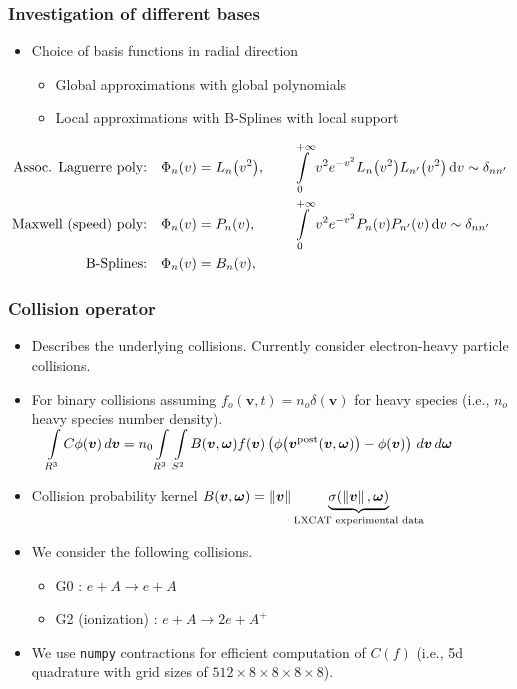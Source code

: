 \documentclass[mathserif, aspectratio=169]{beamer}
\newcommand{\ud}{\,\mathrm{d}}
\newcommand{\vect}[1]{\boldsymbol{#1}}
\newcommand{\of}[1]{\mleft( #1 \mright)}
\newcommand{\myint}{\int\limits}
\newcommand{\diff}[1]{\, d#1}
\newcommand{\norm}[1]{\left\lVert#1\right\rVert}
\begin{document}
\begin{frame}
	\frametitle{Investigation of different bases}
	\begin{itemize}
		\item Choice of basis functions in radial direction
		\begin{itemize}
			\item Global approximations with global polynomials
			\item Local approximations with B-Splines with local support 
		\end{itemize}
	\end{itemize}
		\small
		\begin{align*}
		\textrm{Assoc. Laguerre poly:}
		& \quad \Phi_n\of{v} = L_n\of{v^2}, &&
		\quad 
		\myint_{0}^{+\infty} v^2 e^{-v^2} L_n\of{v^2} L_{n^\prime}\of{v^2} \ud v \sim \delta_{nn^\prime}
		\\
		\textrm{Maxwell (speed) poly:}
		& \quad \Phi_n\of{v} = P_n\of{v}, &&
		\quad 
		\myint_{0}^{+\infty} v^2 e^{-v^2} P_n\of{v} P_{n^\prime}\of{v} \ud v \sim \delta_{nn^\prime}
		\\
		\textrm{B-Splines:}
		& \quad \Phi_n\of{v} = B_n\of{v}, &&
		\end{align*}	
\end{frame}

\begin{frame}[fragile]
	\frametitle{Collision operator}
	\begin{itemize}
		\item Describes the underlying collisions. Currently consider electron-heavy particle collisions. 
		\item For binary collisions assuming $f_o(\vect{v},t)=n_o \delta(\vect{v})$ for heavy species (i.e., $n_o$ heavy species number density). \\
		$	\displaystyle
			\quad
			\myint_{R^3}{} C \phi\of{\vect{v}} \diff{\vect{v}} 
			=
			n_0 \myint_{R^3}{} \myint_{S^2}{} 
			B\of{\vect{v}, \vect{\omega}} 
			f\of{\vect{v}}
			\left(
			\phi\of{\vect{v}^\text{post}\of{\vect{v},\vect{\omega}}} 
			- \phi\of{\vect{v}} 
			\right)
			\diff{\vect{v}} \diff{\vect{\omega}}$
		\item Collision probability kernel $B\of{\vect{v}, \vect{\omega}}=\norm{\vect{v}} \underbrace{\sigma(\norm{\vect{v}}, \vect{\omega})}_{\text{LXCAT experimental data}}$
		\item We consider the following collisions. 
		\begin{itemize}
			\item G0 : $e + A \rightarrow e + A$ 
			\item G2 (ionization) : $e + A \rightarrow 2e + A^+$ 
		\end{itemize}
		\item We use \texttt{numpy} contractions for efficient computation of $C(f)$ (i.e., 5d quadrature with grid sizes of $512\times 8\times 8 \times 8 \times 8$). 
	\end{itemize}
\end{frame}
\end{document}
